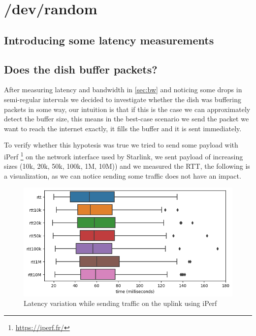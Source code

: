 \documentclass[IN,11pt,twoside,openright,bachelor,english]{tumthesis}
\begin{document}
\chapter{/dev/random}

\section{Introducing some latency measurements}
\section{Does the dish buffer packets?}


After measuring latency and bandwidth in \ref{sec:bw} and noticing some drops in semi-regular intervals we decided to investigate whether the dish was buffering packets in some way, our intuition is that if this is the case we can approximately detect the buffer size, this means in the best-case scenario we send the packet we want to reach the internet exactly, it fills the buffer and it is sent immediately.

To verify whether this hypotesis was true we tried to send some payload with iPerf \footnote{\url{https://iperf.fr/}} on the network interface used by Starlink, we sent payload of increasing sizes (10k, 20k, 50k, 100k, 1M, 10M)) and we measured the RTT, the following is a visualization, as we can notice sending some traffic does not have an impact.


\begin{figure}
	\centering
	\includegraphics[width=0.6\columnwidth]{img/latency_iperf.png}
	\caption{Latency variation while sending traffic on the uplink using iPerf}
\end{figure}

\end{document}
